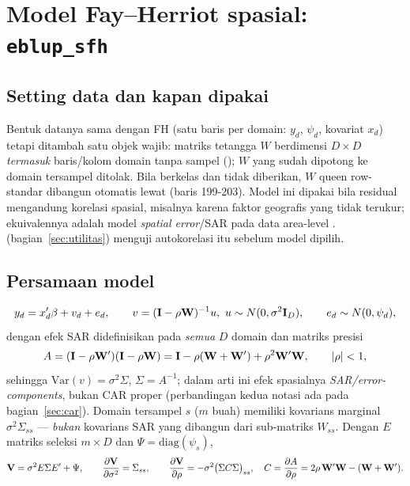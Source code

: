 \section{Model Fay--Herriot spasial: \texttt{eblup\_sfh}}\label{sec:sfh}

\subsection{Setting data dan kapan dipakai}\label{sec:sfh-setting}

Bentuk datanya sama dengan FH (satu baris per domain: $y_d$, $\psi_d$, kovariat
$x_d$) tetapi ditambah satu objek wajib: matriks tetangga $W$ berdimensi
$D\times D$ \emph{termasuk} baris/kolom domain tanpa sampel
(); $W$ yang sudah dipotong ke domain tersampel
ditolak. Bila  berkelas  dan  tidak diberikan,
$W$ queen row-standar dibangun otomatis lewat 
(baris 199-203). Model ini dipakai bila residual mengandung korelasi spasial,
misalnya karena faktor geografis yang tidak terukur; ekuivalennya adalah model
\emph{spatial error}/SAR pada data area-level
\citep{pratesi2008small, rao2015small}. 
(bagian~\ref{sec:utilitas}) menguji autokorelasi itu sebelum model dipilih.

\subsection{Persamaan model}\label{sec:sfh-model}

\begin{equation}
  y_d=x_d'\beta+v_d+e_d,\qquad
  v=(\mathbf{I}-\rho \mathbf{W})^{-1}u,\ u\sim N(0,\sigma^2\mathbf{I}_D),\qquad
  e_d\sim N(0,\psi_d),
  \label{eq:sfh-model}
\end{equation}
dengan efek SAR didefinisikan pada \emph{semua} $D$ domain dan matriks presisi
\begin{equation}
  A=(\mathbf{I}-\rho \mathbf{W}')(\mathbf{I}-\rho \mathbf{W})
   =\mathbf{I}-\rho(\mathbf{W}+\mathbf{W}')+\rho^2\mathbf{W}'\mathbf{W},
  \qquad \left|\rho\right|<1,
  \label{eq:sfh-A}
\end{equation}
sehingga $\mathrm{Var}(v)=\sigma^2\Sigma$, $\Sigma=A^{-1}$; dalam arti ini efek
spasialnya \emph{SAR/error-components}, bukan CAR proper (perbandingan kedua
notasi ada pada bagian~\ref{sec:car}). Domain tersampel $s$ ($m$ buah) memiliki
kovarians marginal $\sigma^2\Sigma_{ss}$ --- \emph{bukan} kovarians SAR yang
dibangun dari sub-matriks $W_{ss}$. Dengan $E$ matriks seleksi $m\times D$ dan
$\Psi=\mathrm{diag}(\psi_s)$,
\begin{equation}
  \mathbf{V}=\sigma^2E\Sigma E'+\Psi,\qquad
  \frac{\partial \mathbf{V}}{\partial\sigma^2}=\Sigma_{ss},\qquad
  \frac{\partial \mathbf{V}}{\partial\rho}=-\sigma^2\bigl(\Sigma C\Sigma\bigr)_{ss},\quad
  C=\frac{\partial A}{\partial\rho}=2\rho\,\mathbf{W}'\mathbf{W}-(\mathbf{W}+\mathbf{W}').
  \label{eq:sfh-deriv}
\end{equation}

